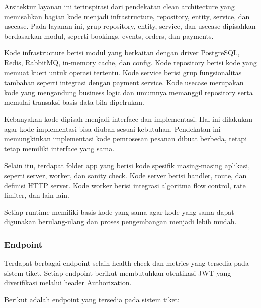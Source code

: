 Arsitektur layanan ini terinspirasi dari pendekatan clean architecture yang memisahkan bagian kode menjadi infrastructure, repository, entity, service, dan usecase. Pada layanan ini, grup repository, entity, service, dan usecase dipisahkan berdasarkan modul, seperti bookings, events, orders, dan payments.

Kode infrastructure berisi modul yang berkaitan dengan driver PostgreSQL, Redis, RabbitMQ, in-memory cache, dan config. Kode repository berisi kode yang memuat kueri untuk operasi tertentu. Kode service berisi grup fungsionalitas tambahan seperti integrasi dengan payment service. Kode usecase merupakan kode yang mengandung business logic dan umumnya memanggil repository serta memulai transaksi basis data bila dipelrukan.

Kebanyakan kode dipisah menjadi interface dan implementasi. Hal ini dilakukan agar kode implementasi bisa diubah sesuai kebutuhan. Pendekatan ini memungkinkan implementasi kode pemrosesan pesanan dibuat berbeda, tetapi tetap memiliki interface yang sama.

Selain itu, terdapat folder app yang berisi kode spesifik masing-masing aplikasi, seperti server, worker, dan sanity check. Kode server berisi handler, route, dan definisi HTTP server. Kode worker berisi integrasi algoritma flow control, rate limiter, dan lain-lain.

Setiap runtime memiliki basis kode yang sama agar kode yang sama dapat digunakan berulang-ulang dan proses pengembangan menjadi lebih mudah.

\subsubsection{Endpoint}

Terdapat berbagai endpoint selain health check dan metrics yang tersedia pada sistem tiket. Setiap endpoint berikut membutuhkan otentikasi JWT yang diverifikasi melalui header Authorization.

Berikut adalah endpoint yang tersedia pada sistem tiket:

